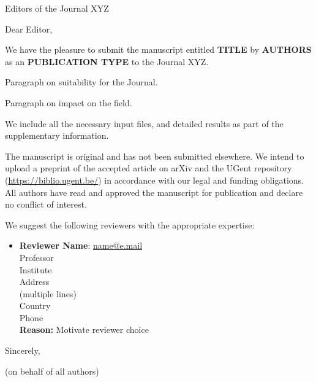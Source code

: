 \documentclass[faculty=we,rightcolwidth=.38,signature,pagenumbers]{ugent-letter}
\begin{document}
\mydate{\today}
\mysubject{}

\begin{letter}{
Editors of the Journal XYZ
}

\opening{Dear Editor,}

We have the pleasure to submit the manuscript entitled
\textbf{TITLE}
by \textbf{AUTHORS} as an \textbf{PUBLICATION TYPE} to the Journal XYZ.

Paragraph on suitability for the Journal.

Paragraph on impact on the field.

We include all the necessary input files, and detailed results as part of the supplementary information.

The manuscript is original and has not been submitted elsewhere.
We intend to upload a preprint of the accepted article on arXiv and the UGent repository (\url{https://biblio.ugent.be/}) in accordance with our legal and funding obligations.
All authors have read and approved the manuscript for publication and declare no conflict of interest.

We suggest the following reviewers with the appropriate expertise:
%
\begin{itemize}[itemsep=12pt]
    \item
    \begin{minipage}[t]{\linewidth}
    \textbf{Reviewer Name}: \href{mailto:name@e.mail}{name@e.mail} \\
    Professor \\
    Institute \\
    Address \\
    (multiple lines) \\
    Country \\
    Phone \\
    \textbf{Reason:} Motivate reviewer choice
    \end{minipage}
\end{itemize}

\closing{Sincerely,}
(on behalf of all authors)

\end{letter}
\end{document}
